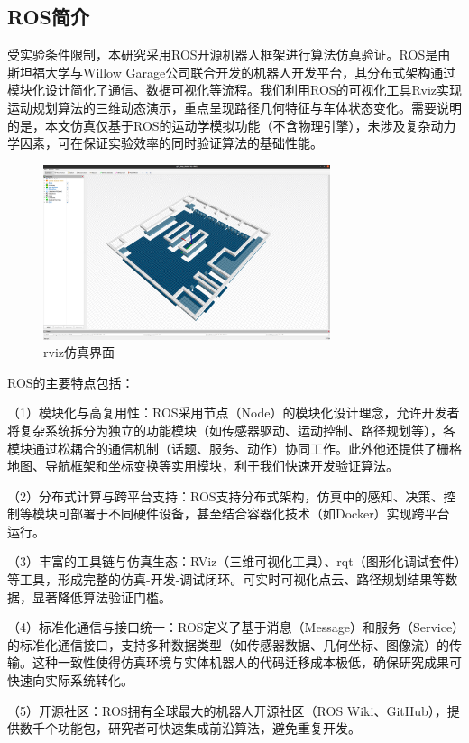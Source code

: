 \documentclass[master,academic]{ysuthesis} %
\begin{document}
	\subsection{ROS简介}
	受实验条件限制，本研究采用ROS开源机器人框架进行算法仿真验证。ROS是由斯坦福大学与Willow Garage公司联合开发的机器人开发平台，其分布式架构通过模块化设计简化了通信、数据可视化等流程。我们利用ROS的可视化工具Rviz实现运动规划算法的三维动态演示，重点呈现路径几何特征与车体状态变化。需要说明的是，本文仿真仅基于ROS的运动学模拟功能（不含物理引擎），未涉及复杂动力学因素，可在保证实验效率的同时验证算法的基础性能。
	\begin{figure}[!ht]
		\centering
		\includegraphics[width=0.75\textwidth]{rviz_view.png}
		\caption{rviz仿真界面}
		\label{fig:rviz仿真界面}
	\end{figure}

	ROS的主要特点包括：

	（1）模块化与高复用性：ROS采用节点（Node）的模块化设计理念，允许开发者将复杂系统拆分为独立的功能模块（如传感器驱动、运动控制、路径规划等），各模块通过松耦合的通信机制（话题、服务、动作）协同工作。此外他还提供了栅格地图、导航框架和坐标变换等实用模块，利于我们快速开发验证算法。

	（2）分布式计算与跨平台支持：ROS支持分布式架构，仿真中的感知、决策、控制等模块可部署于不同硬件设备，甚至结合容器化技术（如Docker）实现跨平台运行。

	（3）丰富的工具链与仿真生态​：RViz（三维可视化工具）、rqt（图形化调试套件）等工具，形成完整的仿真-开发-调试闭环。可实时可视化点云、路径规划结果等数据，显著降低算法验证门槛。

	（4）标准化通信与接口统一：ROS定义了基于消息（Message）和服务（Service）的标准化通信接口，支持多种数据类型（如传感器数据、几何坐标、图像流）的传输。这种一致性使得仿真环境与实体机器人的代码迁移成本极低，确保研究成果可快速向实际系统转化。

	（5）开源社区：ROS拥有全球最大的机器人开源社区（ROS Wiki、GitHub），提供数千个功能包，研究者可快速集成前沿算法，避免重复开发。
\end{document}
